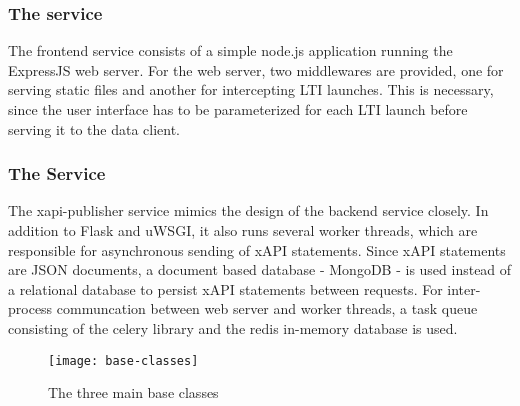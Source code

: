     \subsubsection{The  service}
        The frontend service consists of a simple node.js
        application running the ExpressJS web server. For the
        web server, two middlewares are provided, one for
        serving static files and another for intercepting LTI launches.
        This is necessary, since the user interface has to be
        parameterized for each LTI launch before serving it to the data client.

    \subsubsection{The  Service}
        The xapi-publisher service mimics the design of the
        backend service closely. In addition to Flask and uWSGI,
        it also runs several worker threads, which are responsible for
        asynchronous sending of xAPI statements. Since xAPI statements
        are JSON documents, a document based database - MongoDB - is used instead
        of a relational database to persist xAPI statements between requests.
        For inter-process communcation between web server and
        worker threads, a task queue consisting of the celery library
        and the redis in-memory database is used.

        \begin{wrapfigure}{o}{.5\textwidth}
            \centering
            \texttt{[image: base-classes]}
            \caption{The three main base classes}
            \label{fig:base-classes-dia}
        \end{wrapfigure}

